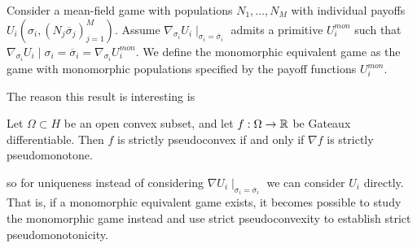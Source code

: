 \begin{definition}
  \label{def:correspondence}
  Consider a mean-field game with populations $N_1,\dots,N_M$ with individual payoffs $U_i(\sigma_i, (N_j \overbar{\sigma}_j)_{j=1}^M)$. Assume $\nabla_{\sigma_i}U_i\mid_{\sigma_i=\overbar{\sigma}_i}$ admits a primitive $U_i^{mon}$ such that $\nabla_{\sigma_i} U_i\mid{\sigma_i = \overbar{\sigma}_i} = \nabla_{\sigma_i} U_i^{mon}$.
   We define the monomorphic equivalent game as the game with monomorphic populations specified by the payoff functions $U_i^{mon}$.
\end{definition}
The reason this result is interesting is
\begin{theorem}
  Let $\Omega \subset H$ be an open convex subset, and let $f:\Omega \to \mathbb{R}$ be Gateaux differentiable. Then $f$ is strictly pseudoconvex if and only if $\nabla f$ is strictly pseudomonotone.
\end{theorem}
so for uniqueness instead of considering $\nabla U_i \mid_{\sigma_i = \overbar{\sigma}_i}$ we can consider $U_i$ directly. That is, if a monomorphic equivalent game exists, it becomes possible to study the monomorphic game instead and use strict pseudoconvexity to establish strict pseudomonotonicity.

